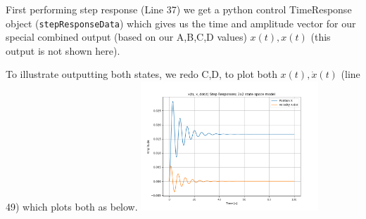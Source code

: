 \begin{ExampleSmall}
First performing step response (Line 37) we get a python control TimeResponse object ({\tt stepResponseData})
which gives us the time and amplitude vector for our special combined output (based on our A,B,C,D values) $x(t), x(t)$
(this output is not shown here).


To illustrate outputting both states, we redo C,D, to plot both $x(t), \dot{x}(t)$ (line 49) which plots both
as below.
\includegraphics[width=0.5\textwidth]{figs08/B14H54.png}
\end{ExampleSmall}



